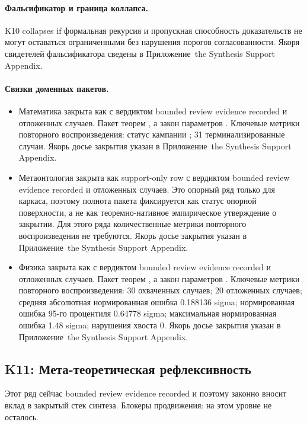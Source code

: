 \paragraph{Фальсификатор и граница коллапса.}
K10 collapses if формальная рекурсия и пропускная способность доказательств не могут оставаться ограниченными без нарушения порогов согласованности.
Якоря свидетелей фальсификатора сведены в Приложение~the Synthesis Support Appendix.

\paragraph{Связки доменных пакетов.}
\begin{itemize}[leftmargin=1.6em,nosep]
\item Математика закрыта как  с вердиктом bounded review evidence recorded и  отложенных случаев. Пакет теорем , а закон параметров . Ключевые метрики повторного воспроизведения: статус кампании ; 31 терминализированные случаи. Якорь досье закрытия указан в Приложение~the Synthesis Support Appendix.
\item Метаонтология закрыта как support-only row с вердиктом bounded review evidence recorded и  отложенных случаев. Это опорный ряд только для каркаса, поэтому полнота пакета фиксируется как статус опорной поверхности, а не как теоремно-нативное эмпирическое утверждение о закрытии. Для этого ряда количественные метрики повторного воспроизведения не требуются. Якорь досье закрытия указан в Приложение~the Synthesis Support Appendix.
\item Физика закрыта как  с вердиктом bounded review evidence recorded и  отложенных случаев. Пакет теорем , а закон параметров . Ключевые метрики повторного воспроизведения: 30 охваченных случаев; 20 отложенных случаев; средняя абсолютная нормированная ошибка 0.188136 sigma; нормированная ошибка 95-го процентиля 0.64778 sigma; максимальная нормированная ошибка 1.48 sigma; нарушения хвоста 0. Якорь досье закрытия указан в Приложение~the Synthesis Support Appendix.
\end{itemize}

\subsection{K11: Мета-теоретическая рефлексивность}
\label{sec:oc-core-1-3-synthesis-k11}
Этот ряд сейчас bounded review evidence recorded и поэтому законно вносит вклад в закрытый стек синтеза.
Блокеры продвижения: на этом уровне не осталось.

